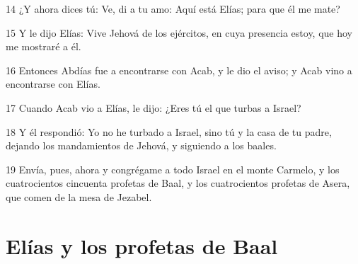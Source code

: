 \par 14 ¿Y ahora dices tú: Ve, di a tu amo: Aquí está Elías; para que él me mate?
\par 15 Y le dijo Elías: Vive Jehová de los ejércitos, en cuya presencia estoy, que hoy me mostraré a él.
\par 16 Entonces Abdías fue a encontrarse con Acab, y le dio el aviso; y Acab vino a encontrarse con Elías.
\par 17 Cuando Acab vio a Elías, le dijo: ¿Eres tú el que turbas a Israel?
\par 18 Y él respondió: Yo no he turbado a Israel, sino tú y la casa de tu padre, dejando los mandamientos de Jehová, y siguiendo a los baales.
\par 19 Envía, pues, ahora y congrégame a todo Israel en el monte Carmelo, y los cuatrocientos cincuenta profetas de Baal, y los cuatrocientos profetas de Asera, que comen de la mesa de Jezabel.

\section*{Elías y los profetas de Baal}

